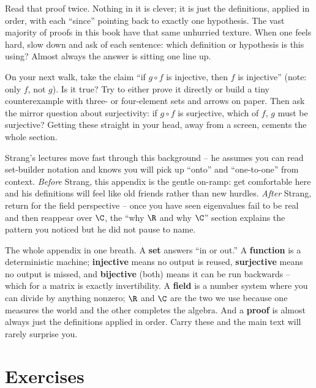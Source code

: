 Read that proof twice. Nothing in it is clever; it is just the definitions, applied in
order, with each ``since'' pointing back to exactly one hypothesis. The vast majority of
proofs in this book have that same unhurried texture. When one feels hard, slow down and
ask of each sentence: which definition or hypothesis is this using? Almost always the
answer is sitting one line up.

\begin{walkbox}
On your next walk, take the claim ``if $g \circ f$ is injective, then $f$ is injective''
(note: only $f$, not $g$). Is it true? Try to either prove it directly or build a tiny
counterexample with three- or four-element sets and arrows on paper. Then ask the mirror
question about surjectivity: if $g \circ f$ is surjective, which of $f$, $g$ must be
surjective? Getting these straight in your head, away from a screen, cements the whole
section.
\end{walkbox}

\begin{strangbox}
Strang's lectures move fast through this background -- he assumes you can read set-builder
notation and knows you will pick up ``onto'' and ``one-to-one'' from context.
\emph{Before} Strang, this appendix is the gentle on-ramp: get comfortable here and his
definitions will feel like old friends rather than new hurdles. \emph{After} Strang,
return for the field perspective -- once you have seen eigenvalues fail to be real and then
reappear over $\C$, the ``why $\R$ and why $\C$'' section explains the pattern you noticed
but he did not pause to name.
\end{strangbox}

\begin{focusbox}
The whole appendix in one breath. A \textbf{set} answers ``in or out.'' A
\textbf{function} is a deterministic machine; \textbf{injective} means no output is reused,
\textbf{surjective} means no output is missed, and \textbf{bijective} (both) means it can
be run backwards -- which for a matrix is exactly invertibility. A \textbf{field} is a
number system where you can divide by anything nonzero; $\R$ and $\C$ are the two we use
because one measures the world and the other completes the algebra. And a \textbf{proof}
is almost always just the definitions applied in order. Carry these and the main text will
rarely surprise you.
\end{focusbox}

\section{Exercises}


